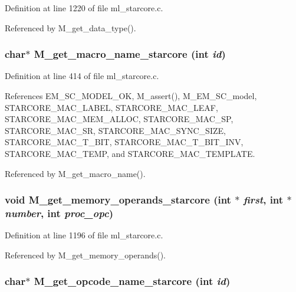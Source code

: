 Definition at line 1220 of file ml\_\-starcore.c.

Referenced by M\_\-get\_\-data\_\-type().
\subsubsection{\setlength{\rightskip}{0pt plus 5cm}char$\ast$ M\_\-get\_\-macro\_\-name\_\-starcore (int {\em id})}\label{m__starcore_8h_3ac81eae133fb08ab8ca2d6487362bd8}




Definition at line 414 of file ml\_\-starcore.c.

References EM\_\-SC\_\-MODEL\_\-OK, M\_\-assert(), M\_\-EM\_\-SC\_\-model, STARCORE\_\-MAC\_\-LABEL, STARCORE\_\-MAC\_\-LEAF, STARCORE\_\-MAC\_\-MEM\_\-ALLOC, STARCORE\_\-MAC\_\-SP, STARCORE\_\-MAC\_\-SR, STARCORE\_\-MAC\_\-SYNC\_\-SIZE, STARCORE\_\-MAC\_\-T\_\-BIT, STARCORE\_\-MAC\_\-T\_\-BIT\_\-INV, STARCORE\_\-MAC\_\-TEMP, and STARCORE\_\-MAC\_\-TEMPLATE.

Referenced by M\_\-get\_\-macro\_\-name().
\subsubsection{\setlength{\rightskip}{0pt plus 5cm}void M\_\-get\_\-memory\_\-operands\_\-starcore (int $\ast$ {\em first}, int $\ast$ {\em number}, int {\em proc\_\-opc})}\label{m__starcore_8h_1fcf33123a5b2eb6e4729799d88eb2f1}




Definition at line 1196 of file ml\_\-starcore.c.

Referenced by M\_\-get\_\-memory\_\-operands().
\subsubsection{\setlength{\rightskip}{0pt plus 5cm}char$\ast$ M\_\-get\_\-opcode\_\-name\_\-starcore (int {\em id})}\label{m__starcore_8h_d62ae2a6fdf408311f66665244f0c128}




